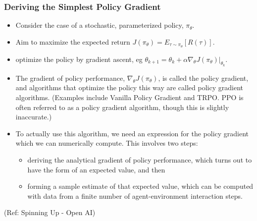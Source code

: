 \begin{frame}[fragile]\frametitle{Deriving the Simplest Policy Gradient}

\begin{itemize}
\item Consider the case of a stochastic, parameterized policy, $\pi_{\theta}$. 
\item Aim to maximize the expected return $J(\pi_{\theta}) = E_{\tau \sim \pi_{\theta}}[R(\tau)]$.
\item optimize the policy by gradient ascent, eg $\theta_{k+1} = \theta_k + \alpha \left. \nabla_{\theta} J(\pi_{\theta}) \right|_{\theta_k}.$ 
\item The gradient of policy performance, $\nabla_{\theta} J(\pi_{\theta})$, is called the policy gradient, and algorithms that optimize the policy this way are called policy gradient algorithms. (Examples include Vanilla Policy Gradient and TRPO. PPO is often referred to as a policy gradient algorithm, though this is slightly inaccurate.)
\item To actually use this algorithm, we need an expression for the policy gradient which we can numerically compute. This involves two steps:
\begin{itemize}
\item deriving the analytical gradient of policy performance, which turns out to have the form of an expected value, and then 
\item forming a sample estimate of that expected value, which can be computed with data from a finite number of agent-environment interaction steps.
\end{itemize}
\end{itemize}

{\tiny (Ref: Spinning Up - Open AI)}
\end{frame}

